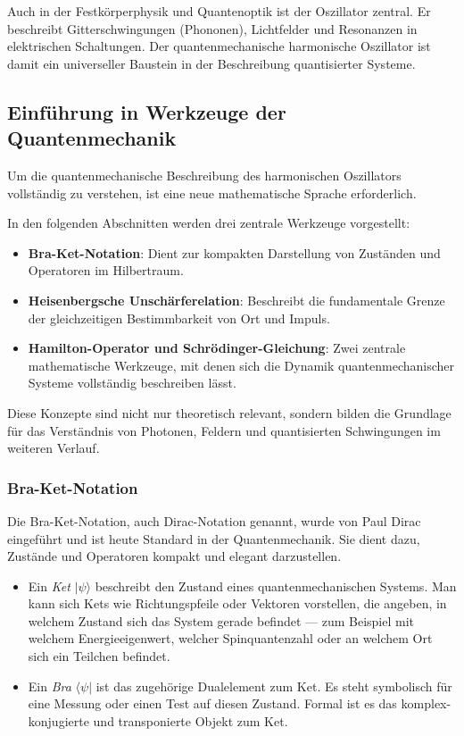 	Auch in der Festkörperphysik und Quantenoptik ist der Oszillator zentral.
	Er beschreibt Gitterschwingungen (Phononen), Lichtfelder und Resonanzen in elektrischen Schaltungen.
	Der quantenmechanische harmonische Oszillator ist damit ein universeller Baustein in der Beschreibung quantisierter Systeme.

\subsection{Einführung in Werkzeuge der Quantenmechanik\label{fourier:subsection:werkzeugeQuantenmechanik}}
	Um die quantenmechanische Beschreibung des harmonischen Oszillators vollständig zu verstehen, ist eine neue mathematische Sprache erforderlich.
	
	In den folgenden Abschnitten werden drei zentrale Werkzeuge vorgestellt:
	\begin{itemize}
	\item \textbf{Bra-Ket-Notation}:
	Dient zur kompakten Darstellung von Zuständen und Operatoren im Hilbertraum.

	\item \textbf{Heisenbergsche Unschärferelation}:
	Beschreibt die fundamentale Grenze der gleichzeitigen Bestimmbarkeit von Ort und Impuls.

	\item \textbf{Hamilton-Operator und Schrödinger-Gleichung}:
	Zwei zentrale mathematische Werkzeuge, mit denen sich die Dynamik quantenmechanischer Systeme vollständig beschreiben lässt.
	\end{itemize}

	Diese Konzepte sind nicht nur theoretisch relevant, sondern bilden die Grundlage für das Verständnis von Photonen, Feldern und quantisierten Schwingungen im weiteren Verlauf.

	\subsubsection{Bra-Ket-Notation\label{fourier:subsubsection:braKetNotation}}
		Die Bra-Ket-Notation, auch Dirac-Notation genannt, wurde von Paul Dirac eingeführt und ist heute Standard in der Quantenmechanik.
		Sie dient dazu, Zustände und Operatoren kompakt und elegant darzustellen.

		\begin{itemize}
			\item Ein \emph{Ket} $|\psi\rangle$ beschreibt den Zustand eines quantenmechanischen Systems.
			Man kann sich Kets wie Richtungspfeile oder Vektoren vorstellen, die angeben, in welchem Zustand sich das System gerade befindet ---
			zum Beispiel mit welchem Energieeigenwert, welcher Spinquantenzahl oder an welchem Ort sich ein Teilchen befindet.
			\item Ein \emph{Bra} $\langle\psi|$ ist das zugehörige Dualelement zum Ket.
			Es steht symbolisch für eine Messung oder einen Test auf diesen Zustand.
			Formal ist es das komplex-konjugierte und transponierte Objekt zum Ket.
		\end{itemize}
		
